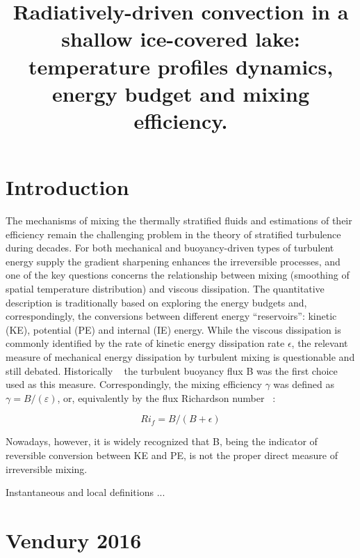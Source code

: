 \documentclass{article}
\title{Radiatively-driven convection in a shallow ice-covered lake: 
temperature profiles dynamics, energy budget and mixing efficiency.
}
\author{}
\begin{document}
\maketitle

\section{Introduction}
The mechanisms of mixing the thermally stratified fluids and estimations of their efficiency remain the challenging problem in the theory of stratified turbulence during decades. For both mechanical and buoyancy-driven types of turbulent energy supply the gradient sharpening enhances the irreversible processes, and one of the key questions concerns the relationship between mixing (smoothing of spatial temperature distribution) and viscous dissipation. The quantitative description is traditionally based on exploring the energy budgets and, correspondingly, the conversions between different energy “reservoirs”: kinetic (KE), potential (PE) and internal (IE) energy. While the viscous dissipation is commonly identified by the rate of kinetic energy dissipation rate $\epsilon$, the relevant measure of mechanical energy dissipation by turbulent mixing is questionable and still debated. Historically ~\cite{turner_buoyancy_1973,Lorenz1955}
the turbulent buoyancy flux B was the first choice used as this measure. Correspondingly, the  mixing efficiency $\gamma$ was defined as $\gamma = B/(\varepsilon)$, or, equivalently by the flux Richardson number ~\cite{Ivey,Imberger, 1991}:   

\begin{equation}\label{eq:Ri}
Ri_f = B/(B+\epsilon)
\end{equation}

Nowadays, however, it is widely recognized that B, being the indicator of reversible conversion between KE and PE, is not the proper direct measure of irreversible mixing.   


Instantaneous and local definitions ...

\section{Vendury 2016}
\end{document}
